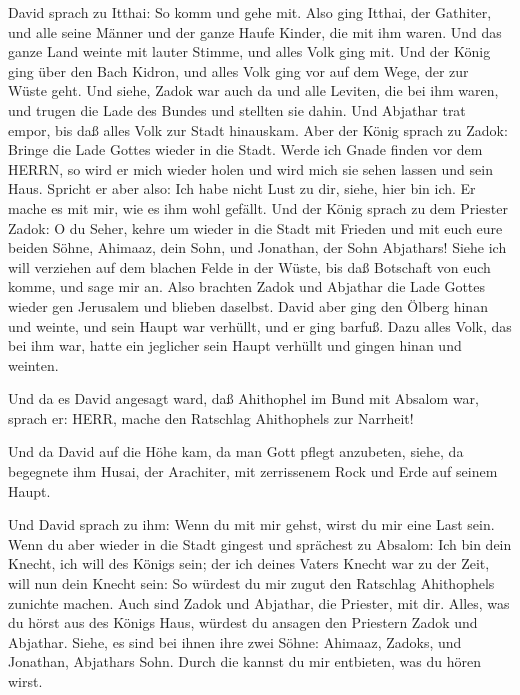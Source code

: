  David sprach zu Itthai: So komm und gehe mit. Also ging
Itthai, der Gathiter, und alle seine Männer und der ganze Haufe Kinder,
die mit ihm waren.  Und das ganze Land weinte mit lauter
Stimme, und alles Volk ging mit. Und der König ging über den Bach
Kidron, und alles Volk ging vor auf dem Wege, der zur Wüste geht.
 Und siehe, Zadok war auch da und alle Leviten, die bei ihm
waren, und trugen die Lade des Bundes und stellten sie dahin. Und
Abjathar trat empor, bis daß alles Volk zur Stadt hinauskam.
 Aber der König sprach zu Zadok: Bringe die Lade Gottes
wieder in die Stadt. Werde ich Gnade finden vor dem HERRN, so wird er
mich wieder holen und wird mich sie sehen lassen und sein Haus.
 Spricht er aber also: Ich habe nicht Lust zu dir, siehe,
hier bin ich. Er mache es mit mir, wie es ihm wohl gefällt.
 Und der König sprach zu dem Priester Zadok: O du Seher,
kehre um wieder in die Stadt mit Frieden und mit euch eure beiden Söhne,
Ahimaaz, dein Sohn, und Jonathan, der Sohn Abjathars! 
Siehe ich will verziehen auf dem blachen Felde in der Wüste, bis daß
Botschaft von euch komme, und sage mir an.  Also brachten
Zadok und Abjathar die Lade Gottes wieder gen Jerusalem und blieben
daselbst.  David aber ging den Ölberg hinan und weinte, und
sein Haupt war verhüllt, und er ging barfuß. Dazu alles Volk, das bei
ihm war, hatte ein jeglicher sein Haupt verhüllt und gingen hinan und
weinten.

 Und da es David angesagt ward, daß Ahithophel im Bund mit
Absalom war, sprach er: HERR, mache den Ratschlag Ahithophels zur
Narrheit!

 Und da David auf die Höhe kam, da man Gott pflegt
anzubeten, siehe, da begegnete ihm Husai, der Arachiter, mit zerrissenem
Rock und Erde auf seinem Haupt.

 Und David sprach zu ihm: Wenn du mit mir gehst, wirst du
mir eine Last sein.  Wenn du aber wieder in die Stadt
gingest und sprächest zu Absalom: Ich bin dein Knecht, ich will des
Königs sein; der ich deines Vaters Knecht war zu der Zeit, will nun dein
Knecht sein: So würdest du mir zugut den Ratschlag Ahithophels zunichte
machen.  Auch sind Zadok und Abjathar, die Priester, mit
dir. Alles, was du hörst aus des Königs Haus, würdest du ansagen den
Priestern Zadok und Abjathar.  Siehe, es sind bei ihnen
ihre zwei Söhne: Ahimaaz, Zadoks, und Jonathan, Abjathars Sohn. Durch
die kannst du mir entbieten, was du hören wirst.

